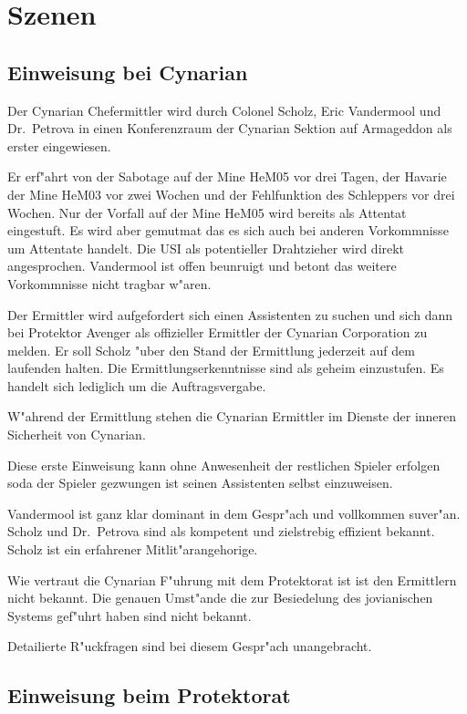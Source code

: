\section{Szenen}

\subsection{Einweisung bei Cynarian}

Der Cynarian Chefermittler wird durch Colonel Scholz, Eric Vandermool und Dr.~Petrova in einen Konferenzraum der Cynarian Sektion auf Armageddon als erster eingewiesen.

Er erf"ahrt von der Sabotage auf der Mine HeM05 vor drei Tagen, der Havarie der Mine HeM03 vor zwei Wochen und der Fehlfunktion des Schleppers vor drei Wochen. Nur der Vorfall auf der Mine HeM05 wird bereits als Attentat eingestuft. Es wird aber gemutma\3t das es sich auch bei anderen Vorkommnisse um Attentate handelt. Die USI als potentieller Drahtzieher wird direkt angesprochen. Vandermool ist offen beunruigt und betont das weitere Vorkommnisse nicht tragbar w"aren.

Der Ermittler wird aufgefordert sich einen Assistenten zu suchen und sich dann bei Protektor Avenger als offizieller Ermittler der Cynarian Corporation zu melden. Er soll Scholz "uber den Stand der Ermittlung jederzeit auf dem laufenden halten. Die Ermittlungserkenntnisse sind als geheim einzustufen. Es handelt sich lediglich um die Auftragsvergabe.

W"ahrend der Ermittlung stehen die Cynarian Ermittler im Dienste der inneren Sicherheit von Cynarian.

\begin{remarks}
Diese erste Einweisung kann ohne Anwesenheit der restlichen Spieler erfolgen soda\3 der Spieler gezwungen ist seinen Assistenten selbst einzuweisen.

Vandermool ist ganz klar dominant in dem Gespr"ach und vollkommen suver"an. Scholz und Dr.~Petrova sind als kompetent und zielstrebig effizient bekannt. Scholz ist ein erfahrener Mitlit"arangehorige.

Wie vertraut die Cynarian F"uhrung mit dem Protektorat ist ist den Ermittlern nicht bekannt. Die genauen Umst"ande die zur Besiedelung des jovianischen Systems gef"uhrt haben sind nicht bekannt.

Detailierte R"uckfragen sind bei diesem Gespr"ach unangebracht.
\end{remarks}

\subsection{Einweisung beim Protektorat}

